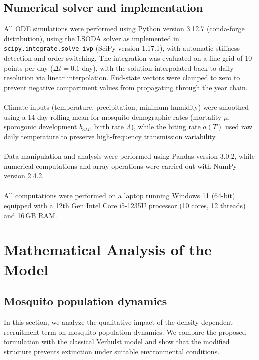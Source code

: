 \documentclass[a4paper,fleqn]{cas-dc}
\begin{document}
\subsection{Numerical solver and implementation}
\label{sec:numerical_solver_implementation}

All ODE simulations were performed using Python version 3.12.7 (conda-forge distribution), using the LSODA solver as implemented in \texttt{scipy.integrate.solve\_ivp} (SciPy version 1.17.1), with automatic stiffness detection and order switching. The integration was evaluated on a fine grid of 10 points per day ($\Delta t = 0.1$ day), with the solution interpolated back to daily resolution via linear interpolation. End-state vectors were clamped to zero to prevent negative compartment values from propagating through the year chain.
\\\\
Climate inputs (temperature, precipitation, minimum humidity) were smoothed using a 14-day rolling mean for mosquito demographic rates (mortality $\mu$, sporogonic development $b_{3M}$, birth rate $\Lambda$), while the biting rate $a(T)$ used raw daily temperature to preserve high-frequency transmission variability.
\\\\
Data manipulation and analysis were performed using Pandas version 3.0.2, while numerical computations and array operations were carried out with NumPy version 2.4.2.
\\\\
All computations were performed on a laptop running Windows 11 (64-bit) equipped with a 12th Gen Intel Core i5-1235U processor (10 cores, 12 threads) and 16\,GB RAM. %


\section{Mathematical Analysis of the Model}
\label{sec:mathematical_analysis_of_model}

\subsection{Mosquito population dynamics}
\label{sec:mosquito_pop_dynamics}
In this section, we analyze the qualitative impact of the density-dependent recruitment term on mosquito population dynamics. 
We compare the proposed formulation with the classical Verhulst model and show that the modified structure prevents extinction under suitable environmental conditions.
\end{document}
